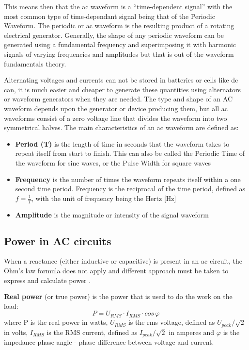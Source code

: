 \documentclass[journal]{IEEEtran}
\begin{document}
This means then that the \gls{ac} waveform is a “time-dependent signal” with the most common type of time-dependant signal being that of the Periodic Waveform. The periodic or \gls{ac} waveform is the resulting product of a rotating electrical generator. Generally, the shape of any periodic waveform can be generated using a fundamental frequency and superimposing it with harmonic signals of varying frequencies and amplitudes but that is out of the waveform fundamentals theory.

Alternating voltages and currents can not be stored in batteries or cells like \gls{dc} can, it is much easier and cheaper to generate these quantities using alternators or waveform generators when they are needed. The type and shape of an AC waveform depends upon the generator or device producing them, but all \gls{ac} waveforms consist of a zero voltage line that divides the waveform into two symmetrical halves. The main characteristics of an \gls{ac} waveform \cite{nicolaides1996electrical} are defined as:

\begin{itemize}
\item \textbf{Period (T)} is the length of time in seconds that the waveform takes to repeat itself from start to finish. This can also be called the Periodic Time of the waveform for sine waves, or the Pulse Width for square waves
\item \textbf{Frequency} is the number of times the waveform repeats itself within a one second time period. Frequency is the reciprocal of the time period, defined as $f = \frac 1 T$, with the unit of frequency being the Hertz [Hz]
\item \textbf{Amplitude}  is the magnitude or intensity of the signal waveform 
\end{itemize}


\subsection{Power in AC circuits} \label{ss:ac_power}
When a reactance (either inductive or capacitive) is present in an \gls{ac} circuit, the Ohm's law formula does not apply and different approach must be taken to express and calculate power \cite{rawlins2000basic}.

\textbf{Real power} (or true power) is the power that is used to do the work on the load:
$$P = U_{RMS} \cdot I_{RMS} \cdot cos\,\varphi$$
where P is the real power in watts, $U_{RMS}$ is the \gls{rms} voltage, defined as $U_{peak}/\sqrt{2}$ in volts, $I_{RMS}$ is the RMS current, defined as $I_{peak}/\sqrt{2}$ in amperes and $\varphi$ is the impedance phase angle - phase difference between voltage and current.
\end{document}
